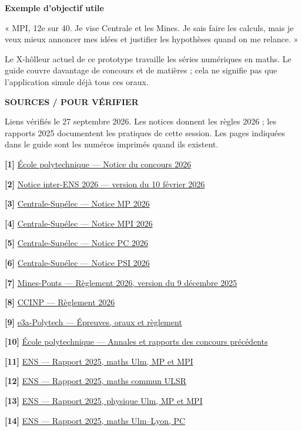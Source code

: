 \documentclass[10pt,a4paper]{article}
\newcommand{\titre}[2]{{\sffamily\small\bfseries\color{teal}#1}\par\vspace{3mm}{\sffamily\bfseries\fontsize{24}{28}\selectfont #2}\par\vspace{3mm}}
\newcommand{\note}[1]{\par{\small\color{muted}#1}\par}
\newcommand{\bloc}[2]{\par\begingroup\setlength{\fboxsep}{4mm}\colorbox{wash}{\parbox{\dimexpr\linewidth-8mm\relax}{\sffamily\bfseries #1\par\normalfont #2}}\endgroup\par}
\newcommand{\lien}[3]{\par\hypertarget{src:#1}{}\label{src:#1}\textbf{[#1]} \href{#3}{#2}\par}
\begin{document}
\bloc{Exemple d'objectif utile}{« MPI, 12e sur 40. Je vise Centrale et les Mines. Je sais faire les calculs, mais je veux mieux annoncer mes idées et justifier les hypothèses quand on me relance. »}
\note{Le X-hôlleur actuel de ce prototype travaille les séries numériques en maths. Le guide couvre davantage de concours et de matières ; cela ne signifie pas que l'application simule déjà tous ces oraux.}
\newpage
\titre{SOURCES / POUR VÉRIFIER}{Notices et rapports officiels}
\note{Liens vérifiés le 27 septembre 2026. Les notices donnent les règles 2026 ; les rapports 2025 documentent les pratiques de cette session. Les pages indiquées dans le guide sont les numéros imprimés quand ils existent.}
\begingroup\small\setlength{\parskip}{3.5pt}
\lien{1}{École polytechnique — Notice du concours 2026}{https://www.polytechnique.edu/admission-cycle-ingenieur/sites/admission/files/content/Notice\%20du\%20concours\%202026\%20publi\%C3\%A9e.pdf}
\lien{2}{Notice inter-ENS 2026 — version du 10 février 2026}{https://www.ens.psl.eu/sites/default/files/notice_interens_2026_mise_en_ligne_vf10022026_.pdf}
\lien{3}{Centrale-Supélec — Notice MP 2026}{https://www.concours-centrale-supelec.fr/sites/default/files/documents/CCS_2026_MP.pdf}
\lien{4}{Centrale-Supélec — Notice MPI 2026}{https://www.concours-centrale-supelec.fr/sites/default/files/documents/CCS_2026_MPI.pdf}
\lien{5}{Centrale-Supélec — Notice PC 2026}{https://www.concours-centrale-supelec.fr/sites/default/files/documents/CCS_2026_PC.pdf}
\lien{6}{Centrale-Supélec — Notice PSI 2026}{https://www.concours-centrale-supelec.fr/sites/default/files/documents/CCS_2026_PSI.pdf}
\lien{7}{Mines-Ponts — Règlement 2026, version du 9 décembre 2025}{https://concoursminesponts.fr/wp-content/uploads/2025/12/reglement-2026-09.12.25.pdf}
\lien{8}{CCINP — Règlement 2026}{https://www.concours-commun-inp.fr/_resource/R\%C3\%A8glement_VF_23-06.pdf?download=true}
\lien{9}{e3a-Polytech — Épreuves, oraux et règlement}{https://www.e3a-polytech.fr/epreuves/}
\lien{10}{École polytechnique — Annales et rapports des concours précédents}{https://www.polytechnique.edu/admission-cycle-ingenieur/en/node/258}
\lien{11}{ENS — Rapport 2025, maths Ulm, MP et MPI}{https://banques-ecoles.fr/cms/wp-content/uploads/2025/11/Rapport_ORAL_MATH-ULM_2025.pdf}
\lien{12}{ENS — Rapport 2025, maths commun ULSR}{https://banques-ecoles.fr/cms/wp-content/uploads/2025/11/Rapport_ORAL_Math_ULSR_2025.pdf}
\lien{13}{ENS — Rapport 2025, physique Ulm, MP et MPI}{https://banques-ecoles.fr/cms/wp-content/uploads/2025/11/Rapport_Oral_Physique-Ulm-2025.pdf}
\lien{14}{ENS — Rapport 2025, maths Ulm--Lyon, PC}{https://banques-ecoles.fr/cms/wp-content/uploads/2025/11/Rapport_Oral_Math_UL_PC_2025.pdf}
\end{document}
